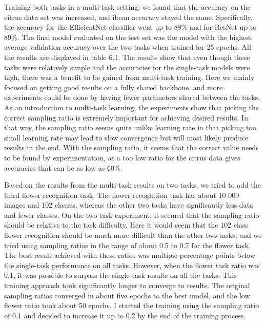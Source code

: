 Training both tasks in a multi-task setting, we found that the accuracy on the citrus data set was increased, and ibean accuracy stayed the same.
Specifically, the accuracy for the EfficientNet classifier went up to 88\% and for ResNet up to 89\%.
The final model evaluated on the test set was the model with the highest average validation accuracy over the two tasks when trained for 25 epochs.
All the results are displayed in table 6.1.
The results show that even though these tasks were relatively simple and the accuracies for the single-task models were high, there was a benefit to be gained from multi-task training.
Here we mainly focused on getting good results on a fully shared backbone, and more experiments could be done by having fewer parameters shared between the tasks.
As an introduction to multi-task learning, the experiments show that picking the correct sampling ratio is extremely important for achieving desired results.
In that way, the sampling ratio seems quite unlike learning rate in that picking too small learning rate may lead to slow convergence but will most likely produce results in the end.
With the sampling ratio, it seems that the correct value needs to be found by experimentation, as a too low ratio for the citrus data gives accuracies that can be as low as 60\%.

Based on the results from the multi-task results on two tasks, we tried to add the third flower recognition task.
The flower recognition task has about 10 000 images and 102 classes, whereas the other two tasks have significantly less data and fewer classes.
On the two task experiment, it seemed that the sampling ratio should be relative to the task difficulty.
Here it would seem that the 102 class flower recognition should be much more difficult than the other two tasks, and we tried using sampling ratios in the range of about 0.5 to 0.7 for the flower task.
The best result achieved with these ratios was multiple percentage points below the single-task performance on all tasks.
However, when the flower task ratio was 0.1, it was possible to surpass the single-task results on all the tasks.
This training approach took significantly longer to converge to results.
The original sampling ratios converged in about five epochs to the best model, and the low flower ratio took about 50 epochs.
I started the training using the sampling ratio of 0.1 and decided to increase it up to 0.2 by the end of the training process.

